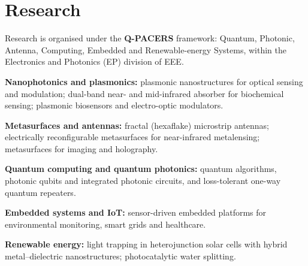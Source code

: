 \section{Research}
\begin{cvblock}
Research is organised under the \textbf{Q-PACERS} framework: Quantum, Photonic, Antenna, Computing, Embedded and Renewable-energy Systems, within the Electronics and Photonics (EP) division of EEE.
\ifdossier\else
\begin{cvlist}
  \item \textbf{Nanophotonics and plasmonics:} plasmonic nanostructures for optical sensing and modulation; dual-band near- and mid-infrared absorber for biochemical sensing; plasmonic biosensors and electro-optic modulators.
  \item \textbf{Metasurfaces and antennas:} fractal (hexaflake) microstrip antennas; electrically reconfigurable metasurfaces for near-infrared metalensing; metasurfaces for imaging and holography.
  \item \textbf{Quantum computing and quantum photonics:} quantum algorithms, photonic qubits and integrated photonic circuits, and loss-tolerant one-way quantum repeaters.
  \item \textbf{Embedded systems and IoT:} sensor-driven embedded platforms for environmental monitoring, smart grids and healthcare.
  \item \textbf{Renewable energy:} light trapping in heterojunction solar cells with hybrid metal--dielectric nanostructures; photocatalytic water splitting.
\end{cvlist}
\fi
\end{cvblock}
\ifdossier
